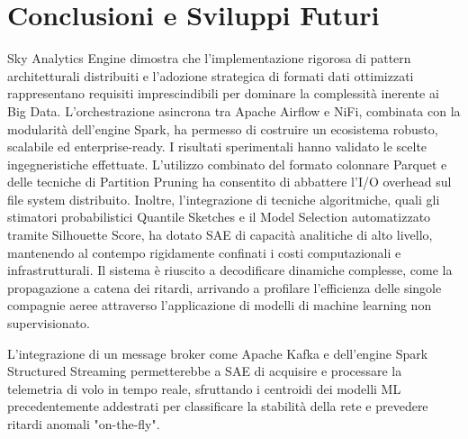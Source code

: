 \documentclass[conference]{IEEEtran}
\begin{document}
\section{Conclusioni e Sviluppi Futuri}\label{sec:conclusions_future_work}
Sky Analytics Engine dimostra che l'implementazione rigorosa di pattern architetturali distribuiti e l'adozione strategica di formati dati ottimizzati rappresentano requisiti imprescindibili per dominare la complessità inerente ai Big Data.
L'orchestrazione asincrona tra Apache Airflow e NiFi, combinata con la modularità dell'engine Spark, ha permesso di costruire un ecosistema robusto, scalabile ed enterprise-ready.
I risultati sperimentali hanno validato le scelte ingegneristiche effettuate.
L'utilizzo combinato del formato colonnare Parquet e delle tecniche di Partition Pruning ha consentito di abbattere l'I/O overhead sul file system distribuito.
Inoltre, l'integrazione di tecniche algoritmiche, quali gli stimatori probabilistici Quantile Sketches e il Model Selection automatizzato tramite Silhouette Score, ha dotato SAE di capacità analitiche di alto livello, mantenendo al contempo rigidamente confinati i costi computazionali e infrastrutturali.
Il sistema è riuscito a decodificare dinamiche complesse, come la propagazione a catena dei ritardi, arrivando a profilare l'efficienza delle singole compagnie aeree attraverso l'applicazione di modelli di machine learning non supervisionato.

L'integrazione di un message broker come Apache Kafka e dell'engine Spark Structured Streaming permetterebbe a SAE di acquisire e processare la telemetria di volo in tempo reale, sfruttando i centroidi dei modelli ML precedentemente addestrati per classificare la stabilità della rete e prevedere ritardi anomali "on-the-fly"\@.
\end{document}

